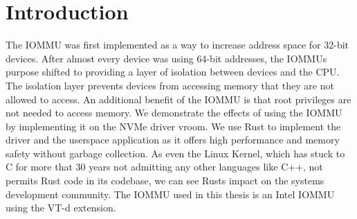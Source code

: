 \chapter{Introduction}\label{c:introduction}

The IOMMU was first implemented as a way to increase address space for 32-bit devices.
After almost every device was using 64-bit addresses, the IOMMUs purpose shifted to providing a layer of isolation between devices and the CPU. \cite{OLS2007}
The isolation layer prevents devices from accessing memory that they are not allowed to access.
An additional benefit of the IOMMU is that root privileges are not needed to access memory.
We demonstrate the effects of using the IOMMU by implementing it on the NVMe driver vroom. \cite{vroom}
We use Rust to implement the driver and the userspace application as it offers high performance and memory safety without garbage collection.
As even the Linux Kernel, which has stuck to C for more that 30 years not admitting any other languages like C++, not permits Rust code in its codebase, we can see Rusts impact on the systems development community.
The IOMMU used in this thesis is an Intel IOMMU using the VT-d extension.